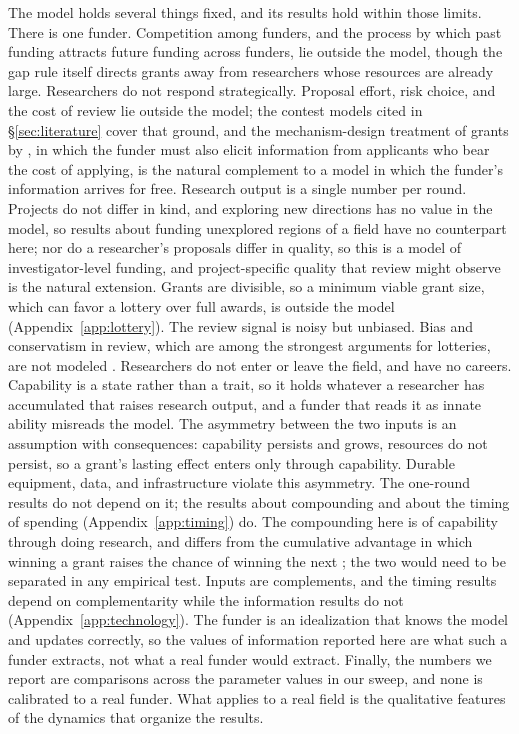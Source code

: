 \documentclass[article, 11pt, reqno]{amsart}
\theoremstyle{named}
\begin{document}
The model holds several things fixed, and its results hold within those limits. There is one funder. Competition among funders, and the process by which past funding attracts future funding across funders, lie outside the model, though the gap rule itself directs grants away from researchers whose resources are already large. Researchers do not respond strategically. Proposal effort, risk choice, and the cost of review lie outside the model; the contest models cited in \S\ref{sec:literature} cover that ground, and the mechanism-design treatment of grants by \citet{Carnehl2024}, in which the funder must also elicit information from applicants who bear the cost of applying, is the natural complement to a model in which the funder's information arrives for free. Research output is a single number per round. Projects do not differ in kind, and exploring new directions has no value in the model, so results about funding unexplored regions of a field have no counterpart here; nor do a researcher's proposals differ in quality, so this is a model of investigator-level funding, and project-specific quality that review might observe is the natural extension. Grants are divisible, so a minimum viable grant size, which can favor a lottery over full awards, is outside the model (Appendix~\ref{app:lottery}). The review signal is noisy but unbiased. Bias and conservatism in review, which are among the strongest arguments for lotteries, are not modeled \citep{Ginther2011, Witteman2019, Boudreau2016}. Researchers do not enter or leave the field, and have no careers. Capability is a state rather than a trait, so it holds whatever a researcher has accumulated that raises research output, and a funder that reads it as innate ability misreads the model. The asymmetry between the two inputs is an assumption with consequences: capability persists and grows, resources do not persist, so a grant's lasting effect enters only through capability. Durable equipment, data, and infrastructure violate this asymmetry. The one-round results do not depend on it; the results about compounding and about the timing of spending (Appendix~\ref{app:timing}) do. The compounding here is of capability through doing research, and differs from the cumulative advantage in which winning a grant raises the chance of winning the next \citep{Merton1968, BolVaanRijt2018}; the two would need to be separated in any empirical test. Inputs are complements, and the timing results depend on complementarity while the information results do not (Appendix~\ref{app:technology}). The funder is an idealization that knows the model and updates correctly, so the values of information reported here are what such a funder extracts, not what a real funder would extract. Finally, the numbers we report are comparisons across the parameter values in our sweep, and none is calibrated to a real funder. What applies to a real field is the qualitative features of the dynamics that organize the results.
\end{document}
